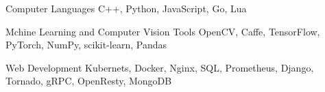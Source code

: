 

\begin{cvskills}

  \cvskill
    {Computer Languages} %
    {C++, Python, JavaScript, Go, Lua} %

  \cvskill
    {Mchine Learning and Computer Vision Tools} %
    {OpenCV, Caffe, TensorFlow, PyTorch, NumPy, scikit-learn, Pandas} %

  \cvskill
    {Web Development} %
    {Kubernets, Docker, Nginx, SQL, Prometheus, Django, Tornado, gRPC, OpenResty, MongoDB} %

\end{cvskills}
